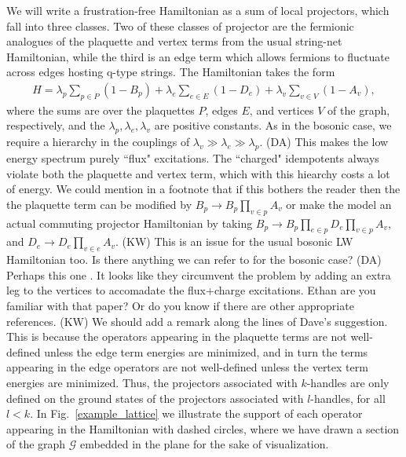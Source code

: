 \documentclass[12pt,a4paper]{article}
\newcounter{arrow}
\newcommand{\mcz}{\mathcal{Z}}
\newcommand{\mcg}{\mathcal{G}}
\newcommand{\kw}[1]{{\color{kwcolor}\footnotesize{(KW) #1}}}
\newcommand{\dave}[1]{{\color{ao(english)}\footnotesize{(DA) #1}}}
\newcommand{\ethan}[1]{{\color{amethyst}\footnotesize{(EL) #1}}}
\begin{document}
We will write a frustration-free Hamiltonian as a sum of local projectors, which fall into
three classes.
Two of these classes of projector are the fermionic analogues of the plaquette and vertex terms from the usual string-net Hamiltonian, 
while the third is an edge term which allows fermions to fluctuate across edges hosting q-type strings.
The Hamiltonian takes the form
\begin{align} \label{ham}
H = \lambda_p \sum_{p \in P} (1-B_p) + \lambda_e \sum_{e \in E} (1-D_e) + \lambda_v \sum_{v \in V} (1-A_v),
\end{align}
where the sums are over the plaquettes $P$, edges $E$, and vertices $V$ of the graph, respectively, and the $\lambda_p,\lambda_e,\lambda_v$ are positive constants.
As in the bosonic case, we require a hierarchy in the couplings of $\lambda_v \gg \lambda_e \gg \lambda_p$.
\dave{This makes the low energy spectrum purely ``flux" excitations. 
The ``charged" idempotents always violate both the plaquette and vertex term, which with this hiearchy costs a lot of energy. 
We could mention in a footnote that if this bothers the reader then the the plaquette term can be modified by $B_p \rightarrow B_p \prod_{v \in p} A_v$ or make the model an actual commuting projector Hamiltonian by taking $B_p \rightarrow B_p \prod_{e \in p} D_e \prod_{v \in p} A_v$, and $D_e \rightarrow D_e \prod_{v \in e} A_v$. }
\kw{This is an issue for the usual bosonic LW Hamiltonian too.
Is there anything we can refer to for the bosonic case?}
\dave{Perhaps this one \cite{hu2015}. 
It looks like they circumvent the problem by adding an extra leg to the vertices to accomadate the flux+charge excitations.
Ethan are you familiar with that paper? Or do you know if there are other appropriate references.}
\kw{We should add a remark along the lines of Dave's suggestion.}
This is because the operators appearing in the plaquette terms are not well-defined unless the edge term energies are minimized, and in turn the terms appearing in the edge operators are not well-defined unless the vertex term energies are minimized.
Thus, the projectors associated with $k$-handles are only defined on the ground states of the projectors associated with $l$-handles, for all $l<k$.  
In Fig.~\ref{example_lattice} we illustrate the support of each operator appearing in the Hamiltonian with dashed circles, where we have drawn a section of the graph $\mcg$ embedded in the plane for the sake of visualization. 
\end{document}

